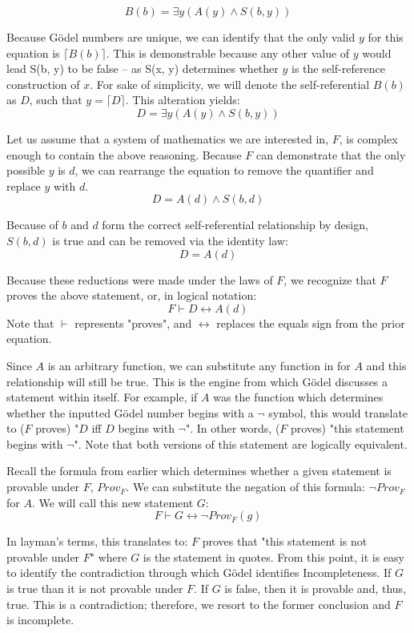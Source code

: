 \documentclass[conference]{IEEEtran}
\begin{document}
\[B(b) = \exists y(A(y) \land S(b,y))\]

Because Gödel numbers are unique, we can identify that the only valid $y$ for this equation is $\lceil B(b) \rceil$. This is demonstrable because any other value of $y$ would lead S(b, y) to be false -- as S(x, y) determines whether $y$ is the self-reference construction of $x$. For sake of simplicity, we will denote the self-referential $B(b)$ as $D$, such that $y = \lceil D \rceil$. This alteration yields:
\[D = \exists y(A(y)\land S(b,y))\]

Let us assume that a system of mathematics we are interested in, $F$, is complex enough to contain the above reasoning. Because $F$ can demonstrate that the only possible $y$ is $d$, we can rearrange the equation to remove the quantifier and replace $y$ with $d$.
\[D = A(d) \land S(b, d)\]

Because of $b$ and $d$ form the correct self-referential relationship by design, $S(b, d)$ is true and can be removed via the identity law:
\[D = A(d)\]

Because these reductions were made under the laws of $F$, we recognize that $F$ proves the above statement, or, in logical notation:
\[F \vdash D \leftrightarrow A(d)\]
Note that $\vdash$ represents "proves", and $\leftrightarrow$ replaces the equals sign from the prior equation. 

Since $A$ is an arbitrary function, we can substitute any function in for $A$ and this relationship will still be true. This is the engine from which Gödel discusses a statement within itself. For example, if $A$ was the function which determines whether the inputted Gödel number begins with a $\neg$ symbol, this would translate to ($F$ proves) "$D$ iff $D$ begins with $\neg$". In other words, ($F$ proves) "this statement begins with $\neg$". Note that both versions of this statement are logically equivalent.

Recall the formula from earlier which determines whether a given statement is provable under $F$, $Prov_F$. We can substitute the negation of this formula: $\neg Prov_F$ for $A$. We will call this new statement $G$:
\[F \vdash G \leftrightarrow \neg Prov_F(g)\]

In layman's terms, this translates to: $F$ proves that "this statement is not provable under $F$" where $G$ is the statement in quotes. From this point, it is easy to identify the contradiction through which Gödel identifies Incompleteness. If $G$ is true than it is not provable under $F$. If $G$ is false, then it is provable and, thus, true. This is a contradiction; therefore, we resort to the former conclusion and $F$ is incomplete.
\end{document}
